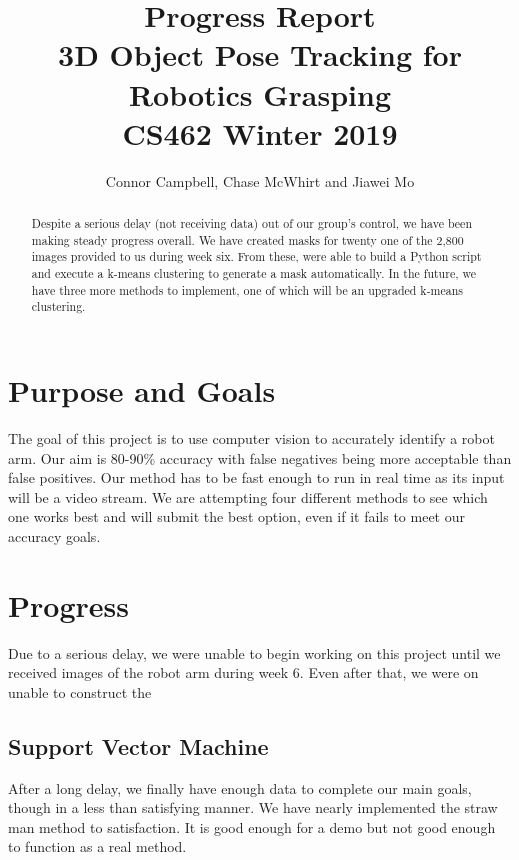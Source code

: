 \documentclass[10pt,journal,compsoc, draftclsnofoot,onecolumn]{IEEEtran}
\begin{document}
\title{
Progress Report\\
3D Object Pose Tracking for Robotics Grasping\\
CS462 Winter 2019
}
\author{Connor Campbell, Chase McWhirt and Jiawei Mo}

\maketitle

\begin{abstract}
Despite a serious delay (not receiving data) out of our group's control, we have been making steady progress overall.
We have created masks for twenty one of the 2,800 images provided to us during week six.
From these, were able to build a Python script and execute a k-means clustering to generate a mask automatically. 
In the future, we have three more methods to implement, one of which will be an upgraded k-means clustering.
\end{abstract}

\IEEEdisplaynontitleabstractindextext
\IEEEpeerreviewmaketitle

\newpage
\pagebreak
\tableofcontents
\pagebreak

\section{Purpose and Goals}
The goal of this project is to use computer vision to accurately identify a robot arm.
Our aim is 80-90\% accuracy with false negatives being more acceptable than false positives.
Our method has to be fast enough to run in real time as its input will be a video stream.
We are attempting four different methods to see which one works best and will submit the best option, even if it fails to meet our accuracy goals.

\noindent
\section{Progress}
Due to a serious delay,
we were unable to begin working on this project until we received images of the robot arm during week 6.
Even after that, we were on unable to construct the 

\subsection{Support Vector Machine}
After a long delay, we finally have enough data to complete our main goals, though in a less than satisfying manner.
We have nearly implemented the straw man method to satisfaction.
It is good enough for a demo but not good enough to function as a real method.
\end{document}
